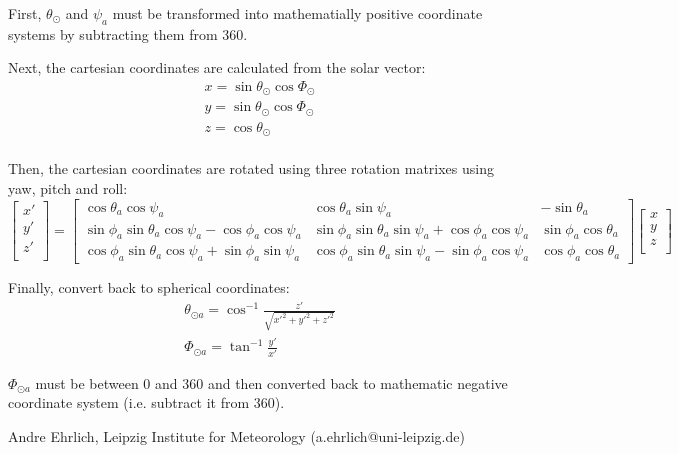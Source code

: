 { %
First, $\theta_\odot$ and $\psi_a$ must be transformed into mathematially positive coordinate systems by subtracting them from 360. 

Next, the cartesian coordinates are calculated from the solar vector:
\begin{gather*}
x = \sin{\theta_\odot} \cos{\Phi_\odot} \\
y = \sin{\theta_\odot} \cos{\Phi_\odot} \\
z = \cos{\theta_\odot} \\
\end{gather*}

Then, the cartesian coordinates are rotated using three rotation matrixes using yaw, pitch and roll:
\begin{displaymath}
 \begin{bmatrix}
  x' \\
  y' \\
  z' \\
 \end{bmatrix} 
=
\begin{bmatrix}
 \cos{\theta_a} \cos{\psi_a} & \cos{\theta_a} \sin{\psi_a} & -\sin{\theta_a} \\
 \sin{\phi_a} \sin{\theta_a} \cos{\psi_a} - \cos{\phi_a} \cos{\psi_a} & \sin{\phi_a} \sin{\theta_a} \sin{\psi_a} + \cos{\phi_a} \cos{\psi_a} & \sin{\phi_a} \cos{\theta_a} \\
 \cos{\phi_a} \sin{\theta_a} \cos{\psi_a} + \sin{\phi_a} \sin{\psi_a} & \cos{\phi_a} \sin{\theta_a} \sin{\psi_a} - \sin{\phi_a} \cos{\psi_a} & \cos{\phi_a} \cos{\theta_a}
\end{bmatrix}
\begin{bmatrix}
 x \\
 y \\ 
 z \\
\end{bmatrix}
\end{displaymath}

Finally, convert back to spherical coordinates:
\begin{gather*}
 \theta_{\odot a} = \cos^{-1}{\frac{z'}{\sqrt{x'^2 + y'^2 + z'^2}}} \\
 \Phi_{\odot a} = \tan^{-1}{\frac{y'}{x'}}
\end{gather*}
%

$\Phi_{\odot a}$ must be between 0 and 360 and then converted back to mathematic negative coordinate system (i.e. subtract it from 360).


}
{ %
Andre Ehrlich, Leipzig Institute for Meteorology (a.ehrlich@uni-leipzig.de)
}
{ %

}


